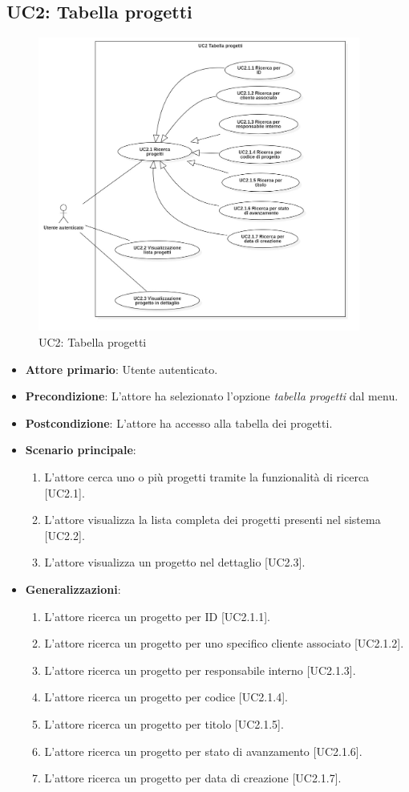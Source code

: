 \subsection{UC2: Tabella progetti}
\begin{figure}[!h]
\centering
\includegraphics[width=400px]{../images/UC/.jpeg/UC2.0-tabellaProgetti.jpg}
\caption{UC2: Tabella progetti}
\end{figure}

\begin{itemize}
\item \textbf{Attore primario}: Utente autenticato.
\item \textbf{Precondizione}: L'attore ha selezionato l'opzione \textit{tabella progetti} dal menu.
\item \textbf{Postcondizione}: L'attore ha accesso alla tabella dei progetti.
\item \textbf{Scenario principale}: 
\begin{enumerate}
\item L'attore cerca uno o più progetti tramite la funzionalità di ricerca [UC2.1].
\item L'attore visualizza la lista completa dei progetti presenti nel sistema [UC2.2].
\item L'attore visualizza un progetto nel dettaglio [UC2.3].
\end{enumerate}
\item \textbf{Generalizzazioni}:
\begin{enumerate}
\item L'attore ricerca un progetto per ID [UC2.1.1].
\item L'attore ricerca un progetto per uno specifico cliente associato [UC2.1.2].
\item L'attore ricerca un progetto per responsabile interno [UC2.1.3].
\item L'attore ricerca un progetto per codice [UC2.1.4].
\item L'attore ricerca un progetto per titolo [UC2.1.5].
\item L'attore ricerca un progetto per stato di avanzamento [UC2.1.6].
\item L'attore ricerca un progetto per data di creazione [UC2.1.7].
\end{enumerate}
\end{itemize}

